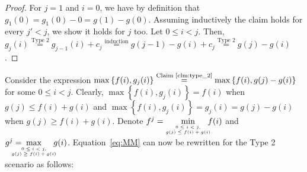 \begin{proof}
	For $j=1$ and $i=0$, we have by definition that $g_1(0) = g_1(0) - 0 = g(1) - g(0)$. 
	Assuming inductively the claim holds for every $j' < j$, we show it holds for $j$ too. Let $0 \leq i < j$. Then,
	$g_j(i) \stackrel{\text{Type 2}}{=} g_{j-1}(i) + c_j \stackrel{\text{induction}}{=} g(j-1) - g(i) + c_j \stackrel{\text{Type 2}}{=} g(j) - g(i)$.
\end{proof}

Consider the expression $\max\left\{f(i), g_j(i)\right\} \stackrel{\text{Claim~\ref{clm:type_2}}}{=} \max\left\{f(i), g(j) - g(i)\right\}$ for some $0 \leq i < j$. Clearly, $\max\left\{f(i), g_j(i)\right\} = f(i)$ when $g(j) \leq f(i) + g(i)$ and $\max\left\{f(i), g_j(i)\right\} = g_j(i) = g(j) - g(i)$ when $g(j) \geq f(i) + g(i)$. Denote $f^j = \hspace{-.5em}\min\limits_{{\tiny\begin{array}{c}
		0 \leq i < j, \\
		g(j) \leq f(i) + g(i)
		\end{array}}} \hspace{-1em} f(i)$
and $g^j = \hspace{-2em}\max\limits_{{\tiny\begin{array}{c}
		0 \leq i < j, \\
		g(j) \geq f(i) + g(i)
		\end{array}}} \hspace{-1em} g(i)$. Equation~\ref{eq:MM} can now be rewritten for the Type 2 scenario as follows:

